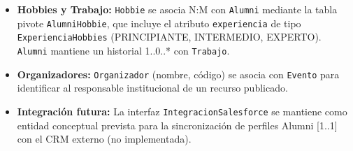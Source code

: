 \documentclass{report}
\begin{document}
\begin{itemize}
    \item \textbf{Hobbies y Trabajo:} \texttt{Hobbie} se asocia N:M con \texttt{Alumni} mediante la tabla pivote \texttt{AlumniHobbie}, que incluye el atributo \texttt{experiencia} de tipo \texttt{ExperienciaHobbies} (PRINCIPIANTE, INTERMEDIO, EXPERTO). \texttt{Alumni} mantiene un historial 1..0..* con \texttt{Trabajo}.
    \item \textbf{Organizadores:} \texttt{Organizador} (nombre, código) se asocia con \texttt{Evento} para identificar al responsable institucional de un recurso publicado.
    \item \textbf{Integración futura:} La interfaz \texttt{IntegracionSalesforce} se mantiene como entidad conceptual prevista para la sincronización de perfiles Alumni [1..1] con el CRM externo (no implementada).
\end{itemize}
\end{document}
